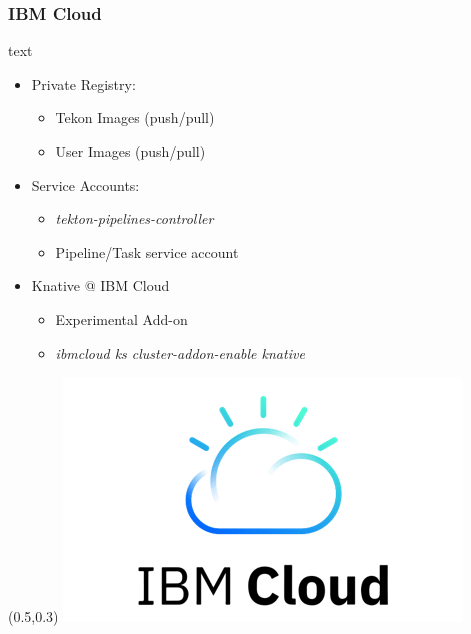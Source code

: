 \documentclass[aspectratio=169,11pt,hyperref={colorlinks=true}]{beamer}
\begin{document}
\begin{lblackrwhiteframe}
\begin{blackframe}
\begin{lblackrwhiteframe}
  \frametitle{IBM Cloud}
  \large
  \begin{beamercolorbox}[wd=0.4\paperwidth]{text}
    \begin{itemize}
      \item Private Registry:
      \begin{itemize}
        \item Tekon Images (push/pull)
        \item User Images (push/pull)
      \end{itemize}
      \item Service Accounts:
      \begin{itemize}
        \item {\em tekton-pipelines-controller}
        \item Pipeline/Task service account
      \end{itemize}
    \end{itemize}
    \vspace{3ex}
    \begin{itemize}
      \item Knative @ IBM Cloud
      \begin{itemize}
        \item Experimental Add-on
        \item {\em ibmcloud ks cluster-addon-enable knative}
      \end{itemize}
    \end{itemize}
  \end{beamercolorbox}%
  \begin{textblock*}{0.5\paperwidth}(0.5\paperwidth,0.3\paperheight)
    \centering
    \includegraphics[width=0.35\paperwidth]{img/IBM-Cloud.png}
  \end{textblock*}
\end{lblackrwhiteframe}


\end{blackframe}
\end{lblackrwhiteframe}
\end{document}
